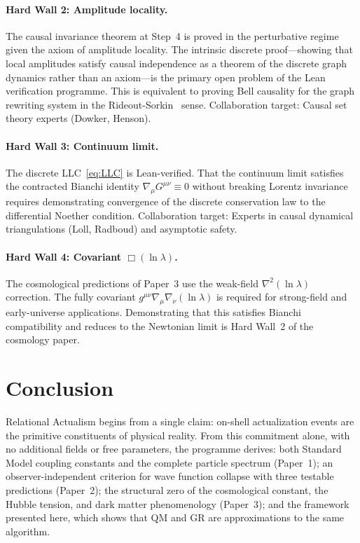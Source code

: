 \documentclass[11pt,twocolumn]{article}
\theoremstyle{plain}
\theoremstyle{remark}
\begin{document}
\paragraph{Hard Wall 2: Amplitude locality.}
The causal invariance theorem at Step~4 is proved in the perturbative
regime given the axiom of amplitude locality.
The intrinsic discrete proof---showing that local amplitudes satisfy
causal independence as a theorem of the discrete graph dynamics
rather than an axiom---is the primary open problem of the Lean
verification programme.
This is equivalent to proving Bell causality for the graph rewriting
system in the Rideout-Sorkin~\cite{RideoutSorkin2000} sense.
Collaboration target: Causal set theory experts (Dowker, Henson).

\paragraph{Hard Wall 3: Continuum limit.}
The discrete LLC~\eqref{eq:LLC} is Lean-verified.
That the continuum limit satisfies the contracted Bianchi identity
$\nabla_\mu G^{\mu\nu} \equiv 0$ without breaking Lorentz invariance
requires demonstrating convergence of the discrete conservation
law to the differential Noether condition.
Collaboration target: Experts in causal dynamical triangulations
(Loll, Radboud) and asymptotic safety.

\paragraph{Hard Wall 4: Covariant $\Box(\ln\lambda)$.}
The cosmological predictions of Paper~3 use the weak-field
$\nabla^2(\ln\lambda)$ correction.
The fully covariant $g^{\mu\nu}\nabla_\mu\nabla_\nu(\ln\lambda)$
is required for strong-field and early-universe applications.
Demonstrating that this satisfies Bianchi compatibility and
reduces to the Newtonian limit is Hard Wall~2 of the cosmology paper.

\section{Conclusion}
\label{sec:conclusion}

Relational Actualism begins from a single claim: on-shell actualization
events are the primitive constituents of physical reality.
From this commitment alone, with no additional fields or free
parameters, the programme derives: both Standard Model coupling
constants and the complete particle spectrum (Paper~1); an
observer-independent criterion for wave function collapse with three
testable predictions (Paper~2); the structural zero of the
cosmological constant, the Hubble tension, and dark matter
phenomenology (Paper~3); and the framework presented here,
which shows that QM and GR are approximations to the same algorithm.
\end{document}
